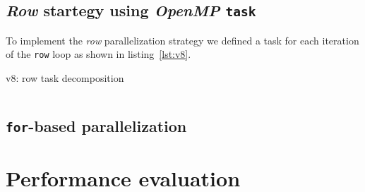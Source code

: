 \subsection{\emph{Row} startegy using \emph{OpenMP} \texttt{task}}%

To implement the \emph{row} parallelization strategy we defined a task for each iteration of
the \texttt{row} loop as shown in listing~\ref{lst:v8}.

\begin{listing}[H]
    \centering
    \caption{v8: row task decomposition}
    \inputminted[firstline=91,lastline=98]{c}{sources/mandel-omp-v8.c}
    \label{lst:v8} 
\end{listing}

\subsection{\texttt{for}-based parallelization}%


\section{Performance evaluation}%
\label{sec:Performance evaluation}



%
%

